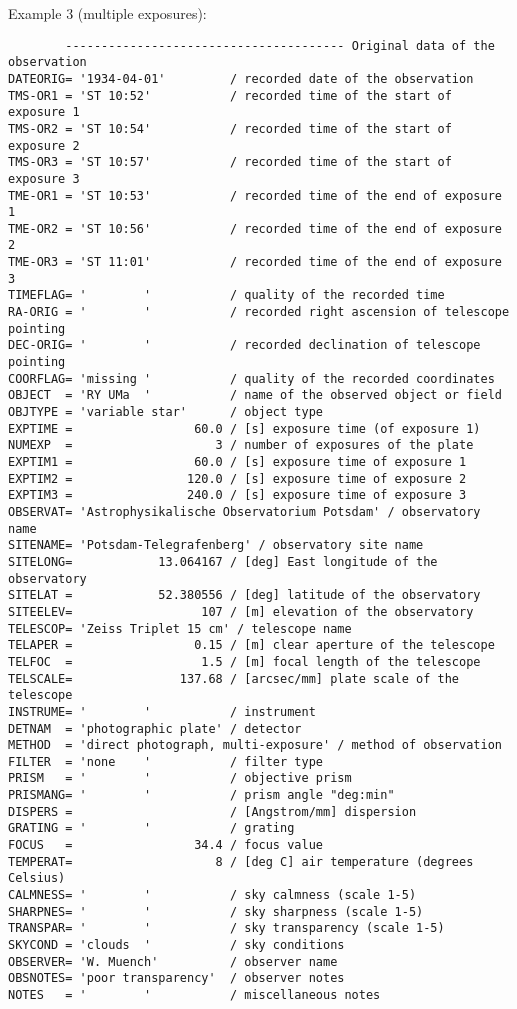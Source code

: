 \documentclass[11pt]{ivoa}
\begin{document}
Example 3 (multiple exposures):

\begin{lstlisting}
        --------------------------------------- Original data of the observation
DATEORIG= '1934-04-01'         / recorded date of the observation
TMS-OR1 = 'ST 10:52'           / recorded time of the start of exposure 1
TMS-OR2 = 'ST 10:54'           / recorded time of the start of exposure 2
TMS-OR3 = 'ST 10:57'           / recorded time of the start of exposure 3
TME-OR1 = 'ST 10:53'           / recorded time of the end of exposure 1
TME-OR2 = 'ST 10:56'           / recorded time of the end of exposure 2
TME-OR3 = 'ST 11:01'           / recorded time of the end of exposure 3
TIMEFLAG= '        '           / quality of the recorded time
RA-ORIG = '        '           / recorded right ascension of telescope pointing
DEC-ORIG= '        '           / recorded declination of telescope pointing
COORFLAG= 'missing '           / quality of the recorded coordinates
OBJECT  = 'RY UMa  '           / name of the observed object or field
OBJTYPE = 'variable star'      / object type
EXPTIME =                 60.0 / [s] exposure time (of exposure 1)
NUMEXP  =                    3 / number of exposures of the plate
EXPTIM1 =                 60.0 / [s] exposure time of exposure 1
EXPTIM2 =                120.0 / [s] exposure time of exposure 2
EXPTIM3 =                240.0 / [s] exposure time of exposure 3
OBSERVAT= 'Astrophysikalische Observatorium Potsdam' / observatory name
SITENAME= 'Potsdam-Telegrafenberg' / observatory site name
SITELONG=            13.064167 / [deg] East longitude of the observatory
SITELAT =            52.380556 / [deg] latitude of the observatory
SITEELEV=                  107 / [m] elevation of the observatory
TELESCOP= 'Zeiss Triplet 15 cm' / telescope name
TELAPER =                 0.15 / [m] clear aperture of the telescope
TELFOC  =                  1.5 / [m] focal length of the telescope
TELSCALE=               137.68 / [arcsec/mm] plate scale of the telescope
INSTRUME= '        '           / instrument
DETNAM  = 'photographic plate' / detector
METHOD  = 'direct photograph, multi-exposure' / method of observation
FILTER  = 'none    '           / filter type
PRISM   = '        '           / objective prism
PRISMANG= '        '           / prism angle "deg:min"
DISPERS =                      / [Angstrom/mm] dispersion
GRATING = '        '           / grating
FOCUS   =                 34.4 / focus value
TEMPERAT=                    8 / [deg C] air temperature (degrees Celsius)
CALMNESS= '        '           / sky calmness (scale 1-5)
SHARPNES= '        '           / sky sharpness (scale 1-5)
TRANSPAR= '        '           / sky transparency (scale 1-5)
SKYCOND = 'clouds  '           / sky conditions
OBSERVER= 'W. Muench'          / observer name
OBSNOTES= 'poor transparency'  / observer notes
NOTES   = '        '           / miscellaneous notes
\end{lstlisting}
\end{document}
